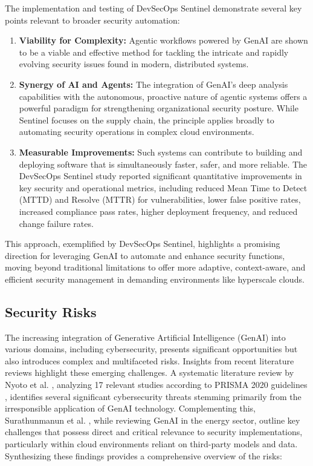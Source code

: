 The implementation and testing of DevSecOps Sentinel demonstrate several key points relevant to broader security automation:

\begin{enumerate}
    \item \textbf{Viability for Complexity:} Agentic workflows powered by GenAI are shown to be a viable and effective method for tackling the intricate and rapidly evolving security issues found in modern, distributed systems\cite{pillala_devsecops_2024}.
    \item \textbf{Synergy of AI and Agents:} The integration of GenAI's deep analysis capabilities with the autonomous, proactive nature of agentic systems offers a powerful paradigm for strengthening organizational security posture\cite{pillala_devsecops_2024}. While Sentinel focuses on the supply chain, the principle applies broadly to automating security operations in complex cloud environments.
    \item \textbf{Measurable Improvements:} Such systems can contribute to building and deploying software that is simultaneously faster, safer, and more reliable. The DevSecOps Sentinel study reported significant quantitative improvements in key security and operational metrics, including reduced Mean Time to Detect (MTTD) and Resolve (MTTR) for vulnerabilities, lower false positive rates, increased compliance pass rates, higher deployment frequency, and reduced change failure rates\cite{pillala_devsecops_2024}.
\end{enumerate}

This approach, exemplified by DevSecOps Sentinel, highlights a promising direction for leveraging GenAI to automate and enhance security functions, moving beyond traditional limitations to offer more adaptive, context-aware, and efficient security management in demanding environments like hyperscale clouds.


\subsection{Security Risks} %
\label{sec:Security Risks}

The increasing integration of Generative Artificial Intelligence (GenAI) into various domains, including cybersecurity, presents significant opportunities but also introduces complex and multifaceted risks. Insights from recent literature reviews highlight these emerging challenges. A systematic literature review by Nyoto et al. \cite{nyoto_cyber_2024}, analyzing 17 relevant studies according to PRISMA 2020 guidelines \cite{page_prisma_2021}, identifies several significant cybersecurity threats stemming primarily from the irresponsible application of GenAI technology. Complementing this, Surathunmanun et al. \cite{surathunmanun_exploring_2024}, while reviewing GenAI in the energy sector, outline key challenges that possess direct and critical relevance to security implementations, particularly within cloud environments reliant on third-party models and data. Synthesizing these findings provides a comprehensive overview of the risks:

